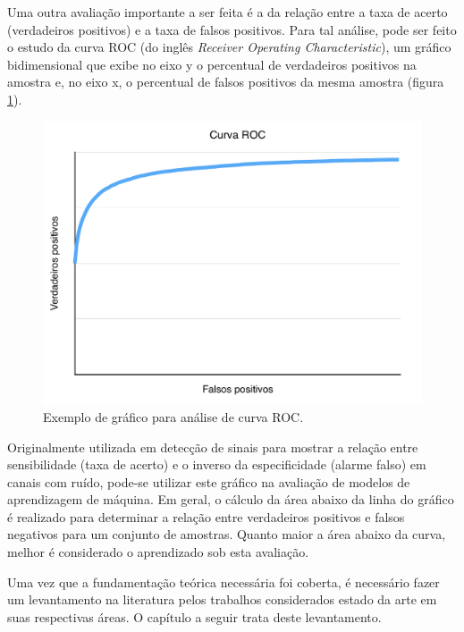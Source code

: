 Uma outra avaliação importante a ser feita é a da relação entre a taxa de acerto (verdadeiros positivos) e  a taxa de falsos positivos. Para tal análise, pode ser feito o estudo da curva ROC (do inglês \textit{Receiver Operating Characteristic}), um gráfico bidimensional que exibe no eixo y o percentual de verdadeiros positivos na amostra e, no eixo x, o percentual de falsos positivos da mesma amostra (figura \ref{fig:roc}).

\begin{figure}[h]
  \centering
  \includegraphics[scale=0.6]{imgs/roc}
  \caption{Exemplo de gráfico para análise de curva ROC.}
  \label{fig:roc}
\end{figure}

Originalmente utilizada em detecção de sinais para mostrar a relação entre sensibilidade (taxa de acerto) e o inverso da especificidade (alarme falso) em canais com ruído, pode-se utilizar este gráfico na avaliação de modelos de aprendizagem de máquina. Em geral, o cálculo da área abaixo da linha do gráfico é realizado para determinar a relação entre verdadeiros positivos e falsos negativos para um conjunto de amostras. Quanto maior a área abaixo da curva, melhor é considerado o aprendizado sob esta avaliação.

Uma vez que a fundamentação teórica necessária foi coberta, é necessário fazer um levantamento na literatura pelos trabalhos considerados estado da arte em suas respectivas áreas. O capítulo a seguir trata deste levantamento.